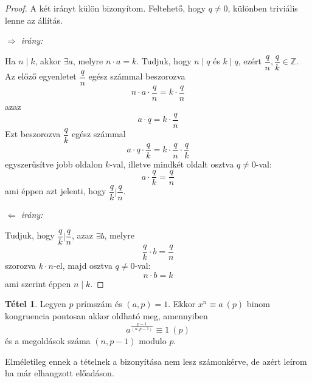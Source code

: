 \documentclass[12pt]{book}
\theoremstyle{plain} %
\theoremstyle{definition} %
\newtheorem{theo/}{Tétel}[section]
\newenvironment{theo}
  {\renewcommand{\qedsymbol}{$\clubsuit$}%
   \pushQED{\qed}\begin{theo/}}
  {\popQED\end{theo/}}
\theoremstyle{remark}
\renewcommand\qedsymbol{$\blacksquare$}
\numberwithin{equation}{section}  %
\begin{document}
	\begin{proof}
		A két irányt külön bizonyítom. Feltehető, hogy $q\neq 0$, különben triviális lenne az állítás.
		
		\textit{$\Rightarrow$ irány:}
		
		Ha $n\mid k$, akkor $\exists a$, melyre $n\cdot a = k$. Tudjuk, hogy $n\mid q$ és $k\mid q$, ezért $\dfrac{q}{n}, \dfrac{q}{k} \in \mathbb{Z}$. Az előző egyenletet $\dfrac{q}{n}$ egész számmal beszorozva
		\[ n\cdot a \cdot \dfrac{q}{n} = k\cdot \dfrac{q}{n}  \]
		azaz 
		\[ a \cdot q = k\cdot \dfrac{q}{n}  \]
		Ezt beszorozva $\dfrac{q}{k}$ egész számmal
		\[ a\cdot q \cdot \dfrac{q}{k} = k\cdot \dfrac{q}{n} \cdot \dfrac{q}{k}  \]
		egyszerűsítve jobb oldalon $k$-val, illetve mindkét oldalt osztva $q\neq 0$-val:
		\[ a\cdot \dfrac{q}{k} = \dfrac{q}{n}  \]
		ami éppen azt jelenti, hogy $\dfrac{q}{k} \mathrel{\bigg|} \dfrac{q}{n}$.
		
		\textit{$\Leftarrow$ irány:}
		
		Tudjuk, hogy $\dfrac{q}{k} \mathrel{\bigg|} \dfrac{q}{n}$, azaz $\exists b$, melyre
		\[ \dfrac{q}{k} \cdot b = \dfrac{q}{n}  \]
		szorozva $k\cdot n$-el, majd osztva $q\neq 0$-val:
		\[ n\cdot b = k  \]
		ami szerint éppen $n\mid k$.
	\end{proof}
	
	\begin{theo}\label{binomkongr}
		Legyen $p$ prímszám és $(a,p)=1$. Ekkor $x^n\equiv a\ (p)$ binom kongruencia pontosan akkor oldható meg, amennyiben
		\[ a^{\frac{p-1}{(n,p-1)}}  \equiv 1 \ (p) \]
		és a megoldások száma $(n,p-1)$ modulo $p$.
	\end{theo}

	Elméletileg ennek a tételnek a bizonyítása nem lesz számonkérve, de azért leírom ha már elhangzott előadáson.
\end{document}
